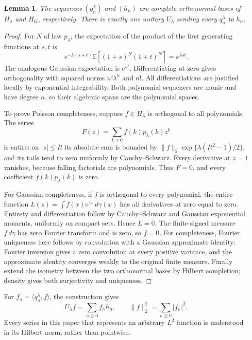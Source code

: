 \documentclass[11pt]{article}
\newtheorem{lemma}[theorem]{Lemma}
\newcommand{\E}{\mathbb E}\newcommand{\Ent}{\operatorname{Ent}}
\begin{document}
\begin{lemma}\label{lem:basis}
The sequences $(q_n^\lambda)$ and $(h_n)$ are complete orthonormal
bases of $H_\lambda$ and $H_G$, respectively. There is exactly one
unitary $U_\lambda$ sending every $q_n^\lambda$ to $h_n$.
\end{lemma}
\begin{proof}
For $N$ of law $p_\lambda$, the expectation of the product of the first
generating functions at $s,t$ is
\[
 e^{-\lambda(s+t)}\E[(1+s)^N(1+t)^N]=e^{\lambda st}.
\]
The analogous Gaussian expectation is $e^{st}$. Differentiating at zero
gives orthogonality with squared norms $n!\lambda^n$ and $n!$.
All differentiations are justified locally by exponential integrability.
Both polynomial sequences are monic and have degree $n$, so their
algebraic spans are the polynomial spaces.

To prove Poisson completeness, suppose $f\in H_\lambda$ is orthogonal
to all polynomials. The series
\[
 F(z)=\sum_{k\geq0} f(k)p_\lambda(k)z^k
\]
is entire: on $|z|\leq R$ its absolute sum is bounded by
$\|f\|_2\exp\{\lambda(R^2-1)/2\}$, and its tails tend to zero
uniformly by Cauchy--Schwarz. Every derivative at $z=1$ vanishes,
because falling factorials are polynomials. Thus $F=0$, and every
coefficient $f(k)p_\lambda(k)$ is zero.

For Gaussian completeness, if $f$ is orthogonal to every polynomial,
the entire function $L(z)=\int f(x)e^{zx}\,d\gamma(x)$ has all
derivatives at zero equal to zero. Entirety and differentiation follow
by Cauchy--Schwarz and Gaussian exponential moments, uniformly on
compact sets. Hence $L=0$. The finite signed measure $f\,d\gamma$
has zero Fourier transform and is zero, so $f=0$. For completeness,
Fourier uniqueness here follows by convolution with a Gaussian
approximate identity: Fourier inversion gives a zero convolution at
every positive variance, and the approximate identity converges weakly
to the original finite measure. Finally extend the isometry between
the two orthonormal bases by Hilbert completion; density gives both
surjectivity and uniqueness.
\end{proof}

For $f_n=\langle q_n^\lambda,f\rangle$, the construction gives
\begin{equation}\label{eq:U}
 U_\lambda f=\sum_{n\geq0}f_n h_n,\qquad
 \|f\|_2^2=\sum_{n\geq0}|f_n|^2.
\end{equation}
Every series in this paper that represents an arbitrary $L^2$ function
is understood in its Hilbert norm, rather than pointwise.
\end{document}
